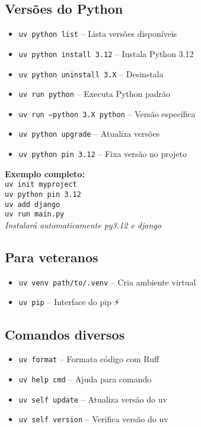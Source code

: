 \documentclass[a4paper,9pt]{article}
\begin{document}
\begin{multicols}{2}
\subsection*{Versões do Python}
\begin{itemize}[leftmargin=0.3cm]
    \item \texttt{uv python list} -- Lista versões disponíveis
    \item \texttt{uv python install 3.12} -- Instala Python 3.12
    \item \texttt{uv python uninstall 3.X} -- Desinstala
    \item \texttt{uv run python} -- Executa Python padrão
    \item \texttt{uv run --python 3.X python} -- Versão específica
    \item \texttt{uv python upgrade} -- Atualiza versões
    \item \texttt{uv python pin 3.12} -- Fixa versão no projeto
\end{itemize}

\begin{tcolorbox}[colback=green!5, colframe=green!40, boxrule=0.5pt, arc=2pt, left=2pt, right=2pt, top=2pt, bottom=2pt]
{\footnotesize \textbf{Exemplo completo:}\\
\texttt{uv init myproject} \\
\texttt{uv python pin 3.12} \\
\texttt{uv add django} \\
\texttt{uv run main.py} \\
\textit{Instalará automaticamente py3.12 e django}
}
\end{tcolorbox}

\subsection*{Para veteranos}
\begin{itemize}[leftmargin=0.3cm]
    \item \texttt{uv venv path/to/.venv} -- Cria ambiente virtual
    \item \texttt{uv pip} -- Interface do pip ⚡
\end{itemize}

\subsection*{Comandos diversos}
\begin{itemize}[leftmargin=0.3cm]
    \item \texttt{uv format} -- Formata código com Ruff
    \item \texttt{uv help cmd} -- Ajuda para comando
    \item \texttt{uv self update} -- Atualiza versão do uv
    \item \texttt{uv self version} -- Verifica versão do uv
\end{itemize}


\end{multicols}
\end{document}
